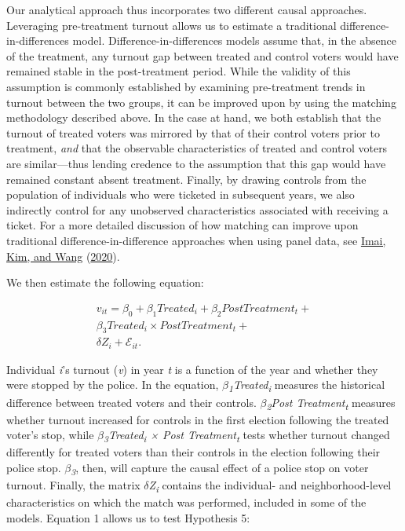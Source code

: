 \documentclass[
  12pt,
]{article}
\begin{document}
Our analytical approach thus incorporates two different causal approaches. Leveraging pre-treatment turnout allows us to estimate a traditional difference-in-differences model. Difference-in-differences models assume that, in the absence of the treatment, any turnout gap between treated and control voters would have remained stable in the post-treatment period. While the validity of this assumption is commonly established by examining pre-treatment trends in turnout between the two groups, it can be improved upon by using the matching methodology described above. In the case at hand, we both establish that the turnout of treated voters was mirrored by that of their control voters prior to treatment, \emph{and} that the observable characteristics of treated and control voters are similar---thus lending credence to the assumption that this gap would have remained constant absent treatment. Finally, by drawing controls from the population of individuals who were ticketed in subsequent years, we also indirectly control for any unobserved characteristics associated with receiving a ticket. For a more detailed discussion of how matching can improve upon traditional difference-in-difference approaches when using panel data, see \protect\hyperlink{ref-Imai2020}{Imai, Kim, and Wang} (\protect\hyperlink{ref-Imai2020}{2020}).

We then estimate the following equation:

\begin{gather}
\label{eq:1}
v_{it}=\beta_0+\beta_1Treated_{i}+\beta_2Post Treatment_{t} + \nonumber \\
\beta_3Treated_{i}\times Post Treatment_{t} + \\
\delta{Z}_{i} + \mathcal{E}_{it}. \nonumber
\end{gather}

Individual \emph{i}'s turnout (\emph{v}) in year \emph{t} is a function of the year and whether they were stopped by the police. In the equation, \emph{\(\beta\)\textsubscript{1}Treated\textsubscript{i}} measures the historical difference between treated voters and their controls. \emph{\(\beta\)\textsubscript{2}Post Treatment\textsubscript{t}} measures whether turnout increased for controls in the first election following the treated voter's stop, while \emph{\(\beta\)\textsubscript{3}Treated\textsubscript{i} × Post Treatment\textsubscript{t}} tests whether turnout changed differently for treated voters than their controls in the election following their police stop. \emph{\(\beta\)\textsubscript{3}}, then, will capture the causal effect of a police stop on voter turnout. Finally, the matrix \emph{\(\delta\)Z\textsubscript{i}} contains the individual- and neighborhood-level characteristics on which the match was performed, included in some of the models. Equation 1 allows us to test Hypothesis 5:
\end{document}
